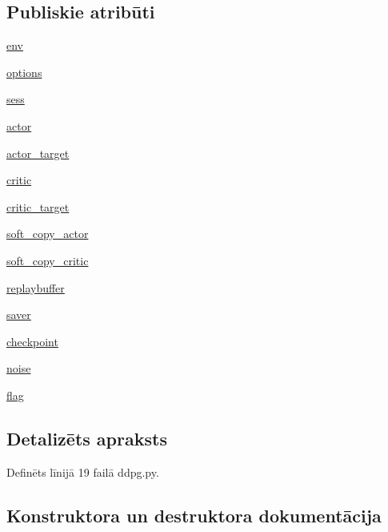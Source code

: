 \subsection*{Publiskie atribūti}
\begin{DoxyCompactItemize}
\item 
\hyperlink{classddpg_1_1_d_d_p_g_a7faf017eedf2120a89e584563d2b80b1}{env}
\item 
\hyperlink{classddpg_1_1_d_d_p_g_a20c64c2cb91fbfa0c705fbab17f027ee}{options}
\item 
\hyperlink{classddpg_1_1_d_d_p_g_a9fed3bda5c1636b1c4bb89fe3a4293c5}{sess}
\item 
\hyperlink{classddpg_1_1_d_d_p_g_ae6f6b492a3680ece32923bb5f145011f}{actor}
\item 
\hyperlink{classddpg_1_1_d_d_p_g_a8b144476a564ad7483fc276939d27f31}{actor\+\_\+target}
\item 
\hyperlink{classddpg_1_1_d_d_p_g_a75e1fa4557d41a8685f47d2d2d730479}{critic}
\item 
\hyperlink{classddpg_1_1_d_d_p_g_a3c8e5f26e9a64fb7af68b7e96d9c8b49}{critic\+\_\+target}
\item 
\hyperlink{classddpg_1_1_d_d_p_g_a2bb041b9ab7c84c83f584a1eae593a87}{soft\+\_\+copy\+\_\+actor}
\item 
\hyperlink{classddpg_1_1_d_d_p_g_a01b575596a4ae50a5ee3656ce9529c94}{soft\+\_\+copy\+\_\+critic}
\item 
\hyperlink{classddpg_1_1_d_d_p_g_af2e26e10a5dd5209afa7a6f3b7d16ab7}{replaybuffer}
\item 
\hyperlink{classddpg_1_1_d_d_p_g_acbd64c92b0d268210807f4e10a214039}{saver}
\item 
\hyperlink{classddpg_1_1_d_d_p_g_a9e0f7ad3975f13452b47eb0a3c5194c7}{checkpoint}
\item 
\hyperlink{classddpg_1_1_d_d_p_g_a9b3d7ee697bd6d7657e0e35b4c1cbd2f}{noise}
\item 
\hyperlink{classddpg_1_1_d_d_p_g_ae456a944d9035ea92e16b3b5d9852dcb}{flag}
\end{DoxyCompactItemize}


\subsection{Detalizēts apraksts}


Definēts līnijā 19 failā ddpg.\+py.



\subsection{Konstruktora un destruktora dokumentācija}
